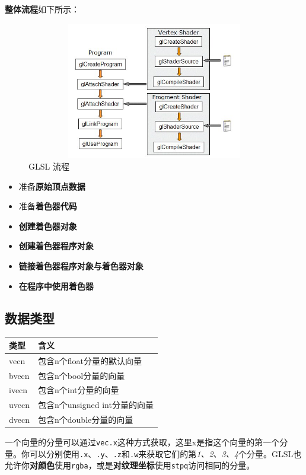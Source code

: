 \documentclass[UTF8,a4paper,12pt]{ctexbook}
\begin{document}
			\textbf{整体流程}如下所示：
			\begin{figure}[htbp]
				\centering
				\includegraphics[width = 12cm, height = 6cm]{GLSLProcess.png}
				\caption{GLSL 流程}
				\label{GLSL}
			\end{figure}
			
			\begin{itemize}[itemindent = 1em]
				\item 准备\textbf{原始顶点数据}
				\item 准备\textbf{着色器代码}
				\item \textbf{创建着色器对象}
				\item \textbf{创建着色器程序对象}
				\item \textbf{链接着色器程序对象与着色器对象}
				\item \textbf{在程序中使用着色器}
			\end{itemize}
			
		\subsection{数据类型}
			\begin{table}[H]
				\centering
				\begin{tabular}{p{3cm}|p{9cm}}
					\toprule
						类型 &  含义  	\\
					\midrule
						vecn &	包含n个float分量的默认向量\\
						bvecn&	包含n个bool分量的向量\\
						ivecn&	包含n个int分量的向量\\
						uvecn&	包含n个unsigned int分量的向量\\
						dvecn&	包含n个double分量的向量\\
					\bottomrule
				\end{tabular}
			\end{table}
			
			一个向量的分量可以通过\verb|vec.x|这种方式获取，这里x是指这个向量的第一个分量。你可以分别使用\verb|.x|、\verb|.y|、\verb|.z|和\verb|.w|来获取它们的第\textit{1、2、3、4}个分量。GLSL也允许你\textbf{对颜色}使用\verb|rgba|，或是\textbf{对纹理坐标}使用\verb|stpq|访问相同的分量。
			
\end{document}

